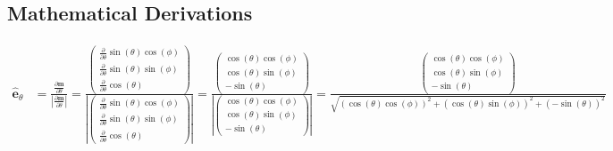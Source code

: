\documentclass[reprint,amsmath,amssymb,aps, floatfix]{revtex4-2}
\begin{document}
\clearpage



\clearpage
\appendix
\begin{widetext}
\section{Mathematical Derivations}
\begin{equation}
    \begin{aligned}
        \hat{\mathbf{e}}_{\theta} & = \frac{\frac{\partial \mathbf{m}}{\partial \theta}}{\left|\frac{\partial \mathbf{m}}{\partial \theta}\right|} 
        = \frac{\begin{pmatrix} \frac{\partial}{\partial \theta} \sin(\theta)\cos(\phi) \\ \frac{\partial}{\partial \theta} \sin(\theta)\sin(\phi) \\ \frac{\partial}{\partial \theta} \cos(\theta) \end{pmatrix}}{\left|\begin{pmatrix} \frac{\partial}{\partial \theta} \sin(\theta)\cos(\phi) \\ \frac{\partial}{\partial \theta} \sin(\theta)\sin(\phi) \\ \frac{\partial}{\partial \theta} \cos(\theta) \end{pmatrix}\right|} 
        = \frac{\begin{pmatrix} \cos(\theta)\cos(\phi) \\ \cos(\theta)\sin(\phi) \\ -\sin(\theta) \end{pmatrix}}{\left|\begin{pmatrix} \cos(\theta)\cos(\phi) \\ \cos(\theta)\sin(\phi) \\ -\sin(\theta) \end{pmatrix}\right|}
        = \frac{\begin{pmatrix} \cos(\theta)\cos(\phi) \\ \cos(\theta)\sin(\phi) \\ -\sin(\theta) \end{pmatrix}}{\sqrt{\left(\cos(\theta)\cos(\phi)\right)^2 + \left(\cos(\theta)\sin(\phi)\right)^2+\left(-\sin(\theta)\right)^2}} \\[1ex]

\end{aligned}
\end{equation}
\end{widetext}
\end{document}
